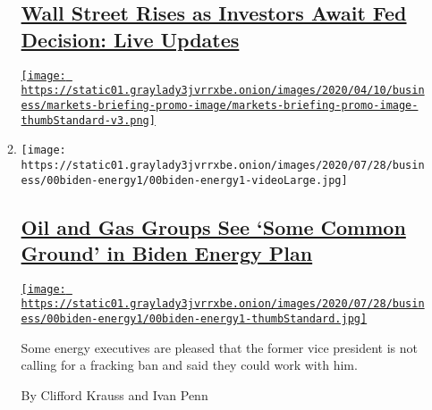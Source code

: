\begin{enumerate}
\begin{enumerate}
    \hypertarget{wall-street-rises-as-investors-await-fed-decision-live-updates}{%
    \subsection{\texorpdfstring{\href{https://www.nytimes3xbfgragh.onion/live/2020/07/29/business/stock-market-today-coronavirus}{Wall
    Street Rises as Investors Await Fed Decision: Live
    Updates}}{Wall Street Rises as Investors Await Fed Decision: Live Updates}}\label{wall-street-rises-as-investors-await-fed-decision-live-updates}}

    \href{https://www.nytimes3xbfgragh.onion/live/2020/07/29/business/stock-market-today-coronavirus}{\texttt{[image: https://static01.graylady3jvrrxbe.onion/images/2020/04/10/business/markets-briefing-promo-image/markets-briefing-promo-image-thumbStandard-v3.png]}}
  \item
    \texttt{[image: https://static01.graylady3jvrrxbe.onion/images/2020/07/28/business/00biden-energy1/00biden-energy1-videoLarge.jpg]}

    \hypertarget{oil-and-gas-groups-see-some-common-ground-in-biden-energy-plan}{%
    \subsection{\texorpdfstring{\href{/2020/07/28/business/energy-environment/joe-biden-oil-gas-energy.html}{Oil
    and Gas Groups See `Some Common Ground' in Biden Energy
    Plan}}{Oil and Gas Groups See `Some Common Ground' in Biden Energy Plan}}\label{oil-and-gas-groups-see-some-common-ground-in-biden-energy-plan}}

    \href{/2020/07/28/business/energy-environment/joe-biden-oil-gas-energy.html}{\texttt{[image: https://static01.graylady3jvrrxbe.onion/images/2020/07/28/business/00biden-energy1/00biden-energy1-thumbStandard.jpg]}}

    Some energy executives are pleased that the former vice president is
    not calling for a fracking ban and said they could work with him.

    By Clifford Krauss and Ivan Penn
  \end{enumerate}
\end{enumerate}


